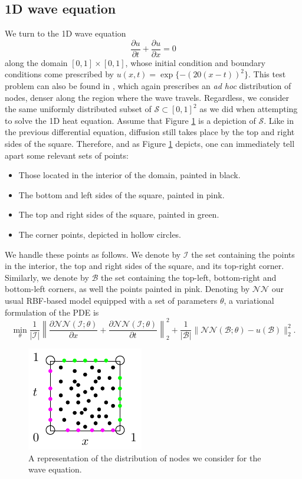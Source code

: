 \documentclass[12pt]{report} %
\begin{document}
\subsection{1D wave equation}

We turn to the 1D wave equation
\[ \frac{\partial u}{\partial t} + \frac{\partial u}{\partial x} = 0 \]
along the domain $[0, 1] \times [0, 1]$, whose initial condition and boundary
conditions come prescribed by $u (x, t) = \exp \{ - (20 (x - t))^2 \}$. This test problem can also be found in \cite{abrahamsen2019explicit}, which again prescribes an \textit{ad hoc} distribution of nodes, denser along the region where the wave travels. Regardless, we consider the same uniformly distributed subset of $\mathcal{S}\subset[0,1]^2$ as we did when attempting to solve the 1D heat equation. Assume that Figure \ref{fig:representation-domain-problem-wave} is a
depiction of $\mathcal{S}$. Like in the previous differential equation, diffusion still takes place by the
top and right sides of the square. Therefore, and as Figure \ref{fig:representation-domain-problem-wave} depicts, one can immediately tell apart some relevant sets of points:
\begin{itemize}
  \item Those located in the interior of the domain, painted in black.
  \item The bottom and left sides of the square, painted in pink.
  \item The top and right sides of the square, painted in green.
  \item The corner points, depicted in hollow circles. 
\end{itemize}

We handle these points as follows. We denote by $\mathcal{I}$ the set containing the points in the interior, the top and right sides of the square, and its top-right corner. Similarly, we denote by $\mathcal{B}$ the set containing the top-left, bottom-right and bottom-left corners, as well the points painted in pink. Denoting by $\mathcal{NN}$ our usual RBF-based model equipped with a set of parameters $\theta$, a variational formulation of the PDE is 
\[ \min_{\theta} \frac{1}{| \mathcal{I} |} \left\| \frac{\partial
   \mathcal{N}\mathcal{N} (\mathcal{I}; \theta)}{\partial x} + \frac{\partial
   \mathcal{N}\mathcal{N} (\mathcal{I}; \theta)}{\partial t} \right\|_2^2 +
   \frac{1}{| \mathcal{B} |} \| \mathcal{N}\mathcal{N} (\mathcal{B}; \theta) -
   u (\mathcal{B}) \|_2^2 . \]

\begin{figure}
  \includegraphics[width=.3\textwidth]{cool_graphics/cuadrado-dominio-edp-onda.pdf}
  \caption{A representation of the distribution of nodes we consider for the wave equation.}
  \label{fig:representation-domain-problem-wave}
\end{figure}
\end{document}
